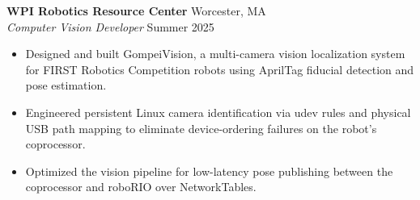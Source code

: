 \textbf{WPI Robotics Resource Center} \hfill Worcester, MA\\
\textit{Computer Vision Developer} \hfill Summer 2025
\begin{itemize}
  \item Designed and built GompeiVision, a multi-camera vision localization system for FIRST Robotics Competition robots using AprilTag fiducial detection and pose estimation.
  \item Engineered persistent Linux camera identification via udev rules and physical USB path mapping to eliminate device-ordering failures on the robot's coprocessor.
  \item Optimized the vision pipeline for low-latency pose publishing between the coprocessor and roboRIO over NetworkTables.
\end{itemize}
